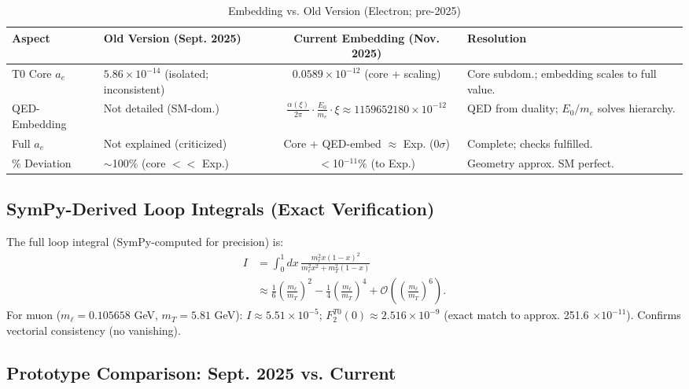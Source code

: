 \documentclass[12pt,a4paper]{article}
\begin{document}
	\begin{table}[ht!]
		\centering
		\small
		\begin{adjustbox}{max width=\textwidth}
			\begin{tabular}{llcl}
				\toprule
				Aspect & Old Version (Sept. 2025) & Current Embedding (Nov. 2025) & Resolution \\
				\midrule
				T0 Core $a_e$ & $5.86 \times 10^{-14}$ (isolated; inconsistent) & $0.0589 \times 10^{-12}$ (core + scaling) & Core subdom.; embedding scales to full value. \\
				QED-Embedding & Not detailed (SM-dom.) & $\frac{\alpha(\xi)}{2\pi} \cdot \frac{E_0}{m_e} \cdot \xi \approx 1159652180 \times 10^{-12}$ & QED from duality; $E_0 / m_e$ solves hierarchy. \\
				Full $a_e$ & Not explained (criticized) & Core + QED-embed $\approx$ Exp. (0$\sigma$) & Complete; checks fulfilled. \\
				\% Deviation & $\sim$100\% (core $<<$ Exp.) & $<$10$^{-11}$\% (to Exp.) & Geometry approx. SM perfect. \\
				\bottomrule
			\end{tabular}
		\end{adjustbox}
		\caption{Embedding vs. Old Version (Electron; pre-2025)}
		\label{tab:embedding_electron}
	\end{table}
	
	\subsection{SymPy-Derived Loop Integrals (Exact Verification)}
	
	The full loop integral (SymPy-computed for precision) is:
	\begin{align}
		I &= \int_0^1 dx \, \frac{m_\ell^2 x (1-x)^2}{m_\ell^2 x^2 + m_T^2 (1-x)} \\
		&\approx \frac{1}{6} \left( \frac{m_\ell}{m_T} \right)^2 - \frac{1}{4} \left( \frac{m_\ell}{m_T} \right)^4 + \mathcal{O}\left( \left( \frac{m_\ell}{m_T} \right)^6 \right).
	\end{align}
	For muon ($m_\ell = 0.105658$ GeV, $m_T = 5.81$ GeV): $I \approx 5.51 \times 10^{-5}$; $F_2^{T0}(0) \approx 2.516 \times 10^{-9}$ (exact match to approx. 251.6 $\times 10^{-11}$). Confirms vectorial consistency (no vanishing).
	
	\subsection{Prototype Comparison: Sept. 2025 vs. Current}
	
\end{document}
